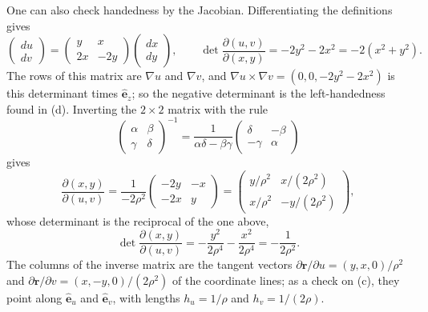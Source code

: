 One can also check handedness by the Jacobian. Differentiating the definitions gives
\[
\begin{pmatrix}du\\dv\end{pmatrix}
=\begin{pmatrix}y&x\\2x&-2y\end{pmatrix}
\begin{pmatrix}dx\\dy\end{pmatrix},\qquad
\det\frac{\partial(u,v)}{\partial(x,y)}=-2y^2-2x^2=-2(x^2+y^2).
\]
The rows of this matrix are $\nabla u$ and $\nabla v$, and
$\nabla u\times\nabla v=(0,0,-2y^2-2x^2)$ is this determinant times
$\hat{\mathbf e}_z$; so the negative determinant is the left-handedness
found in (d).
Inverting the $2\times2$ matrix with the rule
\[
\begin{pmatrix}\alpha&\beta\\\gamma&\delta\end{pmatrix}^{-1}
=\frac1{\alpha\delta-\beta\gamma}
\begin{pmatrix}\delta&-\beta\\-\gamma&\alpha\end{pmatrix}
\]
gives
\[
\frac{\partial(x,y)}{\partial(u,v)}
=\frac{1}{-2\rho^2}\begin{pmatrix}-2y&-x\\-2x&y\end{pmatrix}
=\begin{pmatrix}y/\rho^2&x/(2\rho^2)\\x/\rho^2&-y/(2\rho^2)\end{pmatrix},
\]
whose determinant is the reciprocal of the one above,
\[
\det\frac{\partial(x,y)}{\partial(u,v)}
=-\frac{y^2}{2\rho^4}-\frac{x^2}{2\rho^4}=-\frac1{2\rho^2}.
\]
The columns of the inverse matrix are the tangent vectors
$\partial\mathbf r/\partial u=(y,x,0)/\rho^2$ and
$\partial\mathbf r/\partial v=(x,-y,0)/(2\rho^2)$ of the coordinate
lines; as a check on (c), they point along $\hat{\mathbf e}_u$ and
$\hat{\mathbf e}_v$, with lengths $h_u=1/\rho$ and $h_v=1/(2\rho)$.


